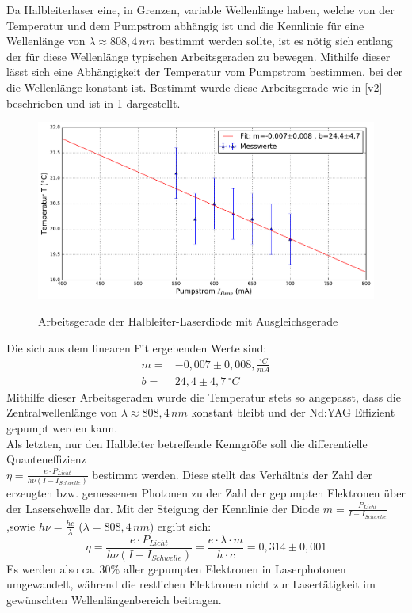 \documentclass[twoside,colorback,accentcolor=tud4c,11pt]{tudreport}
\begin{document}
Da Halbleiterlaser eine, in Grenzen, variable Wellenlänge haben, welche von der Temperatur und dem Pumpstrom abhängig ist und die Kennlinie für eine Wellenlänge von $\lambda\approx 808,4\,\si{nm}$ bestimmt werden sollte, ist es nötig sich entlang der für diese Wellenlänge typischen Arbeitsgeraden zu bewegen. Mithilfe dieser lässt sich eine Abhängigkeit der Temperatur vom Pumpstrom bestimmen, bei der die Wellenlänge konstant ist. Bestimmt wurde diese Arbeitsgerade wie in \ref{v2} beschrieben und ist in \ref{ad} dargestellt.
\begin{figure}[H]
\centering
   	\begin{minipage}[b]{0.9\textwidth}
   	\includegraphics[width=\textwidth]{graphics/arbeitsgerade_hld.pdf}
  	\label{ad}
   	\end{minipage}
\caption{Arbeitsgerade der Halbleiter-Laserdiode mit Ausgleichsgerade}	
\end{figure}
Die sich aus dem linearen Fit ergebenden Werte sind:
\begin{align}
m=&-0,007 \pm 0,008,\si{\frac{^{\circ} C}{mA}}\\
b=&24,4 \pm 4,7\,\si{^{\circ} C}
\end{align}
Mithilfe dieser Arbeitsgeraden wurde die Temperatur stets so angepasst, dass die Zentralwellenlänge von $\lambda\approx 808,4\,\si{nm}$ konstant bleibt und der Nd:YAG Effizient gepumpt werden kann.\\
Als letzten, nur den Halbleiter betreffende Kenngröße soll die differentielle Quanteneffizienz\\ $\eta=\frac{e\cdot P_{Licht}}{h\nu (I-I_{Schwelle})}$ bestimmt werden. Diese stellt das Verhältnis der Zahl der erzeugten bzw. gemessenen Photonen zu der Zahl der gepumpten Elektronen über der Laserschwelle dar. Mit der Steigung der Kennlinie der Diode $m=\frac{P_{Licht}}{I-I_{Schwelle}}$,sowie $h\nu=\frac{hc}{\lambda}$ ($\lambda=808,4\,\si{nm}$) ergibt sich:
\begin{equation}
\eta=\frac{e\cdot P_{Licht}}{h\nu (I-I_{Schwelle})}=\frac{e\cdot\lambda\cdot m}{h\cdot c}=0,314 \pm 0,001
\end{equation}
Es werden also ca. $30\%$ aller gepumpten Elektronen in Laserphotonen umgewandelt, während die restlichen Elektronen nicht zur Lasertätigkeit im gewünschten Wellenlängenbereich beitragen.
\end{document}

